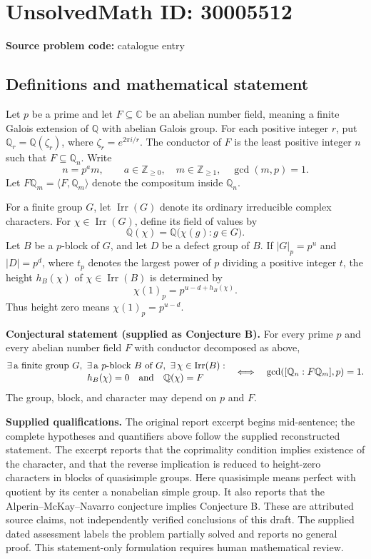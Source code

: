 \documentclass[11pt]{article}
\newcommand{\Z}{\mathbb{Z}}
\newcommand{\Q}{\mathbb{Q}}
\newcommand{\C}{\mathbb{C}}
\begin{document}
\section*{UnsolvedMath ID: 30005512}
\textbf{Source problem code:} catalogue entry
\subsection{Definitions and mathematical statement}
Let \(p\) be a prime and let \(F\subseteq\C\) be an abelian number field, meaning a finite Galois extension of \(\Q\) with abelian Galois group. For each positive integer \(r\), put \(\Q_r=\Q(\zeta_r)\), where \(\zeta_r=e^{2\pi i/r}\). The conductor of \(F\) is the least positive integer \(n\) such that \(F\subseteq\Q_n\). Write
\[
n=p^a m,\qquad a\in\Z_{\geq0},\quad m\in\Z_{\geq1},\quad \gcd(m,p)=1.
\]
Let \(F\Q_m=\langle F,\Q_m\rangle\) denote the compositum inside \(\Q_n\).

For a finite group \(G\), let \(\operatorname{Irr}(G)\) denote its ordinary irreducible complex characters. For \(\chi\in\operatorname{Irr}(G)\), define its field of values by
\[
\Q(\chi)=\Q\bigl(\chi(g):g\in G\bigr).
\]
Let \(B\) be a \(p\)-block of \(G\), and let \(D\) be a defect group of \(B\). If \(|G|_p=p^u\) and \(|D|=p^d\), where \(t_p\) denotes the largest power of \(p\) dividing a positive integer \(t\), the height \(h_B(\chi)\) of \(\chi\in\operatorname{Irr}(B)\) is determined by
\[
\chi(1)_p=p^{u-d+h_B(\chi)}.
\]
Thus height zero means \(\chi(1)_p=p^{u-d}\).

\textbf{Conjectural statement (supplied as Conjecture B).} For every prime \(p\) and every abelian number field \(F\) with conductor decomposed as above,
\[
\begin{aligned}
&\exists\,\text{a finite group }G,\ \exists\,\text{a }p\text{-block }B\text{ of }G,\ 
\exists\,\chi\in\operatorname{Irr}(B):\\[-2pt]
&\hspace{30mm} h_B(\chi)=0\quad\text{and}\quad\Q(\chi)=F
\end{aligned}
\quad\Longleftrightarrow\quad
\gcd\!\left([\Q_n:F\Q_m],p\right)=1.
\]
The group, block, and character may depend on \(p\) and \(F\).

\textbf{Supplied qualifications.} The original report excerpt begins mid-sentence; the complete hypotheses and quantifiers above follow the supplied reconstructed statement. The excerpt reports that the coprimality condition implies existence of the character, and that the reverse implication is reduced to height-zero characters in blocks of quasisimple groups. Here quasisimple means perfect with quotient by its center a nonabelian simple group. It also reports that the Alperin--McKay--Navarro conjecture implies Conjecture B. These are attributed source claims, not independently verified conclusions of this draft. The supplied dated assessment labels the problem partially solved and reports no general proof. This statement-only formulation requires human mathematical review.
\end{document}
